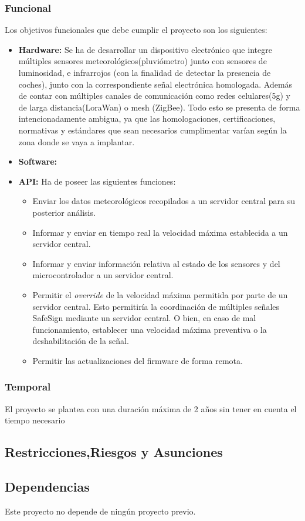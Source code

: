 \documentclass[
	a4paper, %
	12pt, %
]{CSSullivanBusinessReport}
\begin{document}
\begin{fullwidth}
\subsubsection{Funcional}
 Los objetivos funcionales que debe cumplir el proyecto son los siguientes: 
  \begin{itemize}
      \item \textbf{Hardware:} Se ha de desarrollar un dispositivo electrónico que integre múltiples sensores meteorológicos(pluviómetro) junto con sensores de luminosidad, e infrarrojos (con la finalidad de detectar la presencia de coches), junto con la correspondiente señal electrónica homologada. Además de contar con múltiples canales de comunicación como redes celulares(5g) y de larga distancia(LoraWan) o mesh (ZigBee). Todo esto se presenta de forma intencionadamente ambigua, ya que las homologaciones, certificaciones, normativas y estándares que sean necesarios cumplimentar varían según la zona donde se vaya a implantar.
      \item \textbf{Software:}
      \item \textbf{ API:} Ha de poseer las siguientes funciones: 
      \begin{itemize}
          \item   Enviar los datos meteorológicos recopilados a un servidor central para su posterior análisis.
          \item Informar y enviar en tiempo real la velocidad máxima establecida a un servidor central.
          \item Informar y enviar información relativa al estado de los sensores y del microcontrolador a un servidor central.
          \item Permitir el \textit{override} de la velocidad máxima permitida por parte de un servidor central. Esto permitiría la coordinación de múltiples señales SafeSign mediante un servidor central. O bien, en caso de mal funcionamiento, establecer una velocidad máxima preventiva o la deshabilitación de la señal.
          \item Permitir las actualizaciones del firmware de forma remota.
          
      \end{itemize}
      
  \end{itemize}
\subsubsection{Temporal}
El proyecto se plantea con una duración máxima de 2 años sin tener en cuenta el tiempo necesario 
\subsection{Restricciones,Riesgos y Asunciones}
\subsection{Dependencias}
Este proyecto no depende de ningún proyecto previo.

\end{fullwidth}


\end{document}
